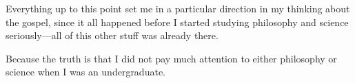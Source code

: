 \begin{compactitem}
			\item Everything up to this point set me in a particular direction in my thinking about the gospel, since it all happened before I started studying philosophy and science seriously---all of this other stuff was already there.
				\begin{compactitem}
					\item Because the truth is that I did not pay much attention to either philosophy or science when I was an undergraduate.
				\end{compactitem}
				

\end{compactitem}
